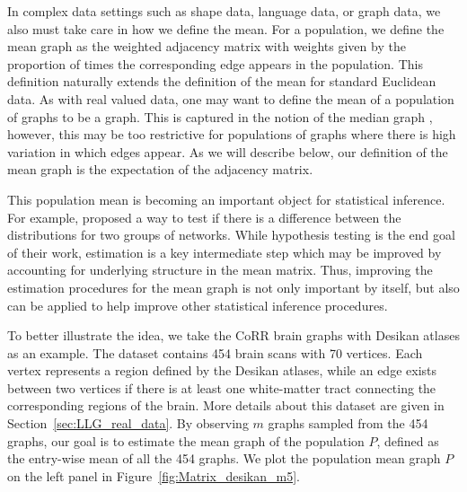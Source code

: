 In complex data settings such as shape data, language data, or graph data, we also must take care in how we define the mean.
For a population, we define the mean graph as the weighted adjacency matrix with weights given by the proportion of times the corresponding edge appears in the population. 
This definition naturally extends the definition of the mean for standard Euclidean data.
As with real valued data, one may want to define the mean of a population of graphs to be a graph.
This is captured in the notion of the median graph \citep{jiang2001median}, however, this may be too restrictive for populations of graphs where there is high variation in which edges appear. 
As we will describe below, our definition of the mean graph is the expectation of the adjacency matrix.

This population mean is becoming an important object for statistical inference.
For example, \citet{ginestet2014hypothesis} proposed a way to test if there is a difference between the distributions for two groups of networks.  
While hypothesis testing is the end goal of their work, estimation is a key intermediate step which may be improved by accounting for underlying structure in the mean matrix. 
Thus, improving the estimation procedures for the mean graph is not only important by itself, but also can be applied to help improve other statistical inference procedures.

To better illustrate the idea, we take the CoRR brain graphs with Desikan atlases as an example. The dataset contains 454 brain scans with 70 vertices. Each vertex represents a region defined by the Desikan atlases, while an edge exists between two vertices if there is at least one white-matter tract connecting the corresponding regions of the brain. More details about this dataset are given in Section~\ref{sec:LLG_real_data}. By observing $m$ graphs sampled from the 454 graphs, our goal is to estimate the mean graph of the population $P$, defined as the entry-wise mean of all the 454 graphs. We plot the population mean graph $P$ on the left panel in Figure~\ref{fig:Matrix_desikan_m5}.


